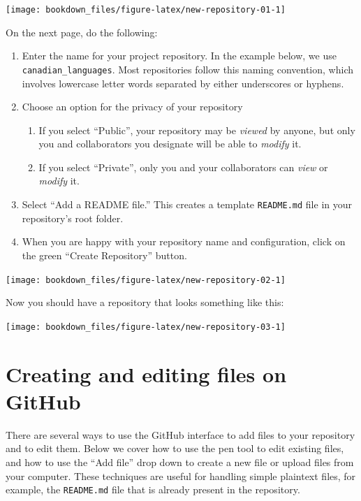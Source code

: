\documentclass[
]{krantz}
\providecommand{\tightlist}{%
  \setlength{\itemsep}{0pt}\setlength{\parskip}{0pt}}
\begin{document}
\texttt{[image: bookdown\_files/figure-latex/new-repository-01-1]}

On the next page, do the following:

\begin{enumerate}
\def\labelenumi{\arabic{enumi}.}
\tightlist
\item
  Enter the name for your project repository. In the example below, we use \texttt{canadian\_languages}. Most repositories follow this naming convention, which involves lowercase letter words separated by either underscores or hyphens.
\item
  Choose an option for the privacy of your repository

  \begin{enumerate}
  \def\labelenumii{\arabic{enumii}.}
  \tightlist
  \item
    If you select ``Public'', your repository may be \emph{viewed} by anyone, but only you and collaborators you designate will be able to \emph{modify} it.
  \item
    If you select ``Private'', only you and your collaborators can \emph{view} or \emph{modify} it.
  \end{enumerate}
\item
  Select ``Add a README file.'' This creates a template \texttt{README.md} file in your repository's root folder.
\item
  When you are happy with your repository name and configuration, click on the green ``Create Repository'' button.
\end{enumerate}

\texttt{[image: bookdown\_files/figure-latex/new-repository-02-1]}

Now you should have a repository that looks something like this:

\texttt{[image: bookdown\_files/figure-latex/new-repository-03-1]}

\hypertarget{creating-and-editing-files-on-github}{%
\section{Creating and editing files on GitHub}\label{creating-and-editing-files-on-github}}

There are several ways to use the GitHub interface to add files to your repository and to edit them.
Below we cover how to use the pen tool to edit existing files, and how to use the ``Add file'' drop down
to create a new file or upload files from your computer. These techniques are useful for handling simple
plaintext files, for example, the \texttt{README.md} file that is already present in the repository.
\end{document}
